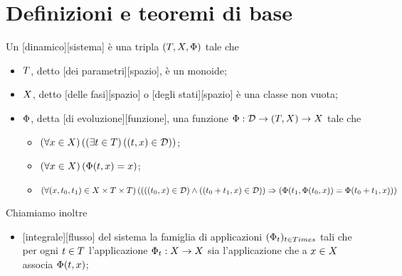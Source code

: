 \section{Definizioni e teoremi di base}
\label{SistemiDinamici_DefinizioniETeoremiDiBase}
\begin{Definition}
	Un [dinamico][sistema] \`e una tripla $(T,X,\Phi)$ tale che
	\begin{itemize}
		\item $T$, detto [dei parametri][spazio], \`e un monoide;
		\item $X$, detto [delle fasi][spazio] o [degli stati][spazio] \`e una classe non vuota;
		\item $\Phi$, detta [di evoluzione][funzione], una funzione $\Phi: \mathcal{D} \rightarrow (T,X) \rightarrow X$ tale che
		\begin{itemize}
			\item $\left ( \forall x \in X \right ) \left ( \left ( \exists t \in T \right ) \left ( (t,x) \in \mathcal{D} \right ) \right )$;
			\item $\left ( \forall x \in X \right ) \left ( \Phi(t,x) = x \right )$;
			\item $\left ( \forall (x,t_0,t_1) \in X \times T \times T \right ) \left ( \left ( \left ( (t_0,x) \in \mathcal{D} \right ) \wedge \left ( (t_0 + t_1,x) \in \mathcal{D} \right ) \right ) \Rightarrow \left ( \Phi(t_1,\Phi(t_0,x)) = \Phi(t_0 + t_1, x) \right ) \right )$
		\end{itemize}
	\end{itemize}
	Chiamiamo inoltre
	\begin{itemize}
		\item {}[integrale][flusso] del sistema la famiglia di applicazioni $(\Phi_t)_{t \in Times}$ tali che per ogni $t \in T$  l'applicazione $\Phi_t: X \rightarrow X$ sia l'applicazione che a $x \in X$ associa $\Phi(t,x)$;
	\end{itemize}
\end{Definition}

